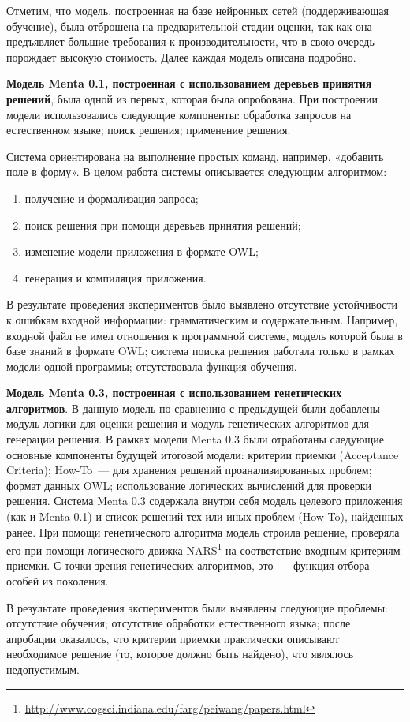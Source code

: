 Отметим, что модель, построенная на базе нейронных сетей (поддерживающая обучение), была отброшена на предварительной стадии оценки, так как она предъявляет большие требования к производительности, что в свою очередь порождает высокую стоимость. Далее каждая модель описана подробно.

\textbf{Модель Menta 0.1, построенная с использованием деревьев принятия решений}, была одной из первых, которая была опробована. При построении модели использовались следующие компоненты: обработка запросов на естественном языке; поиск решения; применение решения. \par
Система ориентирована на выполнение простых команд, например, «добавить поле в форму». В целом работа системы описывается следующим алгоритмом:
\begin{enumerate}
	\item получение и формализация запроса;
	\item поиск решения при помощи деревьев принятия решений;
	\item изменение модели приложения в формате OWL;
	\item генерация и компиляция приложения.
\end{enumerate} \par
В результате проведения экспериментов было выявлено отсутствие устойчивости к ошибкам входной информации: грамматическим и содержательным. Например, входной файл не имел отношения к программной системе, модель которой была в базе знаний в формате OWL; система поиска решения работала только в рамках модели одной программы;  отсутствовала функция обучения. \par



\textbf{Модель Menta 0.3, построенная с использованием генетических алгоритмов}.
В данную модель по сравнению с предыдущей были добавлены модуль логики для оценки решения и модуль генетических алгоритмов для генерации решения. В рамках модели Menta 0.3 были отработаны следующие основные компоненты будущей итоговой модели: критерии приемки (Acceptance Criteria); How-To~--- для хранения решений проанализированных проблем; формат данных OWL; использование логических вычислений для проверки решения. Система Menta 0.3 содержала внутри себя модель целевого приложения (как и Menta 0.1) и список решений тех или иных проблем (How-To), найденных ранее. При помощи генетического алгоритма модель строила решение, проверяла его при помощи логического движка NARS\footnote{\url{http://www.cogsci.indiana.edu/farg/peiwang/papers.html}} на соответствие входным критериям приемки. С точки зрения генетических алгоритмов, это~--- функция отбора особей из поколения.  \par
В результате проведения экспериментов были выявлены следующие проблемы: отсутствие обучения; отсутствие обработки естественного языка; после апробации оказалось, что критерии приемки практически описывают необходимое решение (то, которое должно быть найдено), что являлось недопустимым. \par


